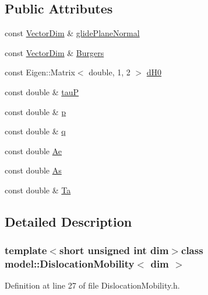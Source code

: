 \subsection*{Public Attributes}
\begin{DoxyCompactItemize}
\item 
const \hyperlink{classmodel_1_1_dislocation_mobility_add1b850a21bdb55ae123917bf02022d0}{Vector\+Dim} \& \hyperlink{classmodel_1_1_dislocation_mobility_a171d42953b3a3cbac83c78e96e2bc656}{glide\+Plane\+Normal}
\item 
const \hyperlink{classmodel_1_1_dislocation_mobility_add1b850a21bdb55ae123917bf02022d0}{Vector\+Dim} \& \hyperlink{classmodel_1_1_dislocation_mobility_a9f1ca817486fb1a6303ab7b07c923205}{Burgers}
\item 
const Eigen\+::\+Matrix$<$ double, 1, 2 $>$ \hyperlink{classmodel_1_1_dislocation_mobility_a15e09f67ce91fc5988559ff7a6b077ee}{d\+H0}
\item 
const double \& \hyperlink{classmodel_1_1_dislocation_mobility_ae6da53fc5cecff940de33c9d67ed20f1}{tau\+P}
\item 
const double \& \hyperlink{classmodel_1_1_dislocation_mobility_a6a2683a113319006c82b60aff0a8b02d}{p}
\item 
const double \& \hyperlink{classmodel_1_1_dislocation_mobility_a3ad1a43275d2d5b17c5ea5c715681134}{q}
\item 
const double \hyperlink{classmodel_1_1_dislocation_mobility_a7449aeb7ba7beeb91d4a4ac66443caeb}{Ae}
\item 
const double \hyperlink{classmodel_1_1_dislocation_mobility_a721ae6abb598d3d69e65001fc5f7f8f9}{As}
\item 
const double \& \hyperlink{classmodel_1_1_dislocation_mobility_a0de69214bd455c20bb81291765f7d34c}{Ta}
\end{DoxyCompactItemize}


\subsection{Detailed Description}
\subsubsection*{template$<$short unsigned int dim$>$class model\+::\+Dislocation\+Mobility$<$ dim $>$}



Definition at line 27 of file Dislocation\+Mobility.\+h.



